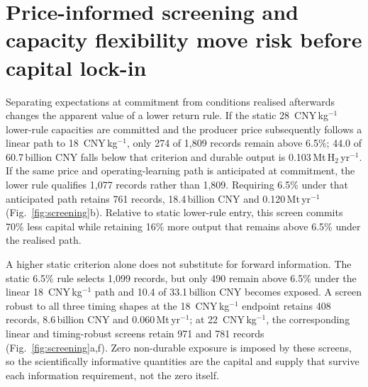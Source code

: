 \documentclass[pdflatex,sn-nature]{sn-jnl}
\newcommand{\cnykg}{CNY\,kg$^{-1}$}
\begin{document}
\section*{Price-informed screening and capacity flexibility move risk before capital lock-in}

Separating expectations at commitment from conditions realised afterwards changes the apparent value of a lower return rule. If the static 28~\cnykg{} lower-rule capacities are committed and the producer price subsequently follows a linear path to 18~\cnykg{}, only 274 of 1,809 records remain above 6.5\%; 44.0 of 60.7\,billion CNY falls below that criterion and durable output is 0.103\,Mt\,H$_2$\,yr$^{-1}$. If the same price and operating-learning path is anticipated at commitment, the lower rule qualifies 1,077 records rather than 1,809. Requiring 6.5\% under that anticipated path retains 761 records, 18.4\,billion CNY and 0.120\,Mt\,yr$^{-1}$ (Fig.~\ref{fig:screening}b). Relative to static lower-rule entry, this screen commits 70\% less capital while retaining 16\% more output that remains above 6.5\% under the realised path.

A higher static criterion alone does not substitute for forward information. The static 6.5\% rule selects 1,099 records, but only 490 remain above 6.5\% under the linear 18~\cnykg{} path and 10.4 of 33.1\,billion CNY becomes exposed. A screen robust to all three timing shapes at the 18~\cnykg{} endpoint retains 408 records, 8.6\,billion CNY and 0.060\,Mt\,yr$^{-1}$; at 22~\cnykg{}, the corresponding linear and timing-robust screens retain 971 and 781 records (Fig.~\ref{fig:screening}a,f). Zero non-durable exposure is imposed by these screens, so the scientifically informative quantities are the capital and supply that survive each information requirement, not the zero itself.
\end{document}
